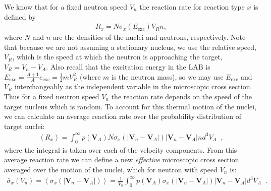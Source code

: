 \documentclass[11pt]{article}
\renewcommand\vec{\mathbf}
\begin{document}
We know that for a fixed neutron speed \(V_n\) the reaction rate for reaction type \(x\) is defined by
\begin{align}
  R_x = N \sigma_x(E_\text{exc}) V_R n,
\end{align}
where \(N\) and \(n\) are the densities of the nuclei and neutrons, respectively.  Note that because we are not assuming a stationary nucleus, we use the relative speed, \(V_R\), which is the speed at which the neutron is approaching the target, \(V_R = V_n - V_A\).  Also recall that the excitation energy  in the LAB is \(E_\text{exc} = \frac{A+1}{A}e_\text{exc} = \frac{1}{2}mV_R^2\) (where \(m\) is the neutron mass), so we may use \(E_\text{exc}\) and \(V_R\) interchangeably as the independent variable in the microscopic cross section.  Thus for a fixed neutron speed \(V_n\) the reaction rate depends on the speed of the target nucleus which is random.  To account for this thermal motion of the nuclei, we can calculate an average reaction rate over the probability distribution of target nuclei:
\begin{align}
  \left<R_x\right> = \int_0^\infty p(\vec{V}_A) N \sigma_x(\left| \vec{V}_n - \vec{V}_A \right|) \left| \vec{V}_n - \vec{V}_A \right| n d^3V_A \;\;,
\end{align}
where the integral is taken over each of the velocity components.  From this average reaction rate we can define a new \emph{effective} microscopic cross section averaged over the motion of the nuclei, which for neutron with speed \(V_n\) is:
\begin{align}
  \bar{\sigma}_x(V_n) = 
  \left<\sigma_x(\left| \vec{V}_n - \vec{V}_A \right|)\right> = 
  \frac{1}{V_n} \int_0^\infty p(\vec{V}_A) \sigma_x(\left| \vec{V}_n - \vec{V}_A \right|) \left| \vec{V}_n - \vec{V}_A \right| d^3V_A \;\;.
\end{align}
\end{document}
